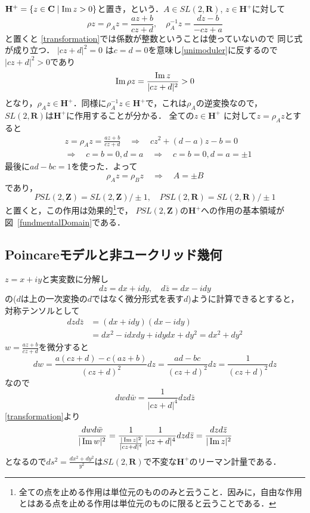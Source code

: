 $\mathbf H^{+}=\{z \in \mathbf C\mid \operatorname{Im} z  >0\}$と置き，という．$A\in SL(2,\mathbf R)$, $z\in \mathbf H^{+}$に対して
\begin{equation}\label{transformation1}
	\rho z  =\rho_{A}z = \frac{a z +b}{c z +d}, \quad
	\rho^{-1}_{A} z  = \frac{d z -b}{-c z +a}
\end{equation}
と置くと
\eqref{transformation}では係数が整数ということは使っていないので
同じ式が成り立つ．
$|c z +d|^2=0$ は$c=d=0$を意味し\eqref{unimoduler}に反するので$|c z +d|^2>0$であり
\[
	\operatorname{Im} \rho z  =\frac{ \operatorname{Im} z }{|c z +d|^2}>0
\]
となり，$\rho_{A} z \in \mathbf H^{+}$．同様に$\rho_{A}^{-1} z \in \mathbf H^{+}$で，これは$\rho_{A}$の逆変換なので，
$SL(2,\mathbf R)$は$\mathbf H^{+}$に作用することが分かる．
全ての$z\in \mathbf H^{+}$ に対して$z= \rho_{A} z$とすると
\[
\begin{split}
	&z= \rho_{A} z =\frac{a z +b}{c z +d} \quad\Rightarrow\quad
	cz^2 + (d-a)z  - b =0\\
	&\Rightarrow\quad
	c=b=0 , d=a
	\quad\Rightarrow\quad
	c=b=0 , d=a=\pm 1
\end{split}
\]
最後に$ad-bc=1$を使った．よって
\[
	\rho_{A} z=\rho_{B} z\quad\Rightarrow\quad
	A =\pm B
\]
であり，
\[
	PSL(2,\mathbf Z)
	=
	SL(2,\mathbf Z)/\pm 1,\quad
	PSL(2,\mathbf R)
	=
	SL(2,\mathbf R)/\pm 1
\]
と置くと，この作用は効果的\footnote{全ての点を止める作用は単位元のもののみと云うこと．因みに，自由な作用とはある点を止める作用は単位元のものに限ると云うことである．}で，
$PSL(2,\mathbf Z)$の$\mathbf H^{+}$への作用の基本領域が図~\ref{fundmentalDomain}である．



\subsection{Poincareモデルと非ユークリッド幾何}
$z = x + i y$と実変数に分解し
\[
	dz = dx + idy,\quad d\bar z = dx - idy
\]
の($d$は上の一次変換の$d$ではなく微分形式を表す$d$)ように計算できるとすると，対称テンソルとして
\[
\begin{split}
	dz d\bar z&=(dx + idy)( dx - idy)\\
	&=dx^2 -idxdy + idydx + dy^2
	=dx^2+dy^2
\end{split}
\]
$w= \frac{az+b}{cz+d}$を微分すると
\[
	dw = \frac{a(cz+d)-c(az+b)}{(cz+d)^2}dz
	=\frac{ad-bc}{(cz+d)^2}dz=\frac{1}{(cz+d)^2}dz
\]
なので
\[
	dw d\bar w
	=\frac{1}{|cz+d|^4}dz d\bar z
\]
\eqref{transformation}より
\[
	\frac{dw d\bar w}{|\operatorname{Im} w|^2}
	=\frac{1}{\frac{ |\operatorname{Im} z|^2}{|cz+d|^4}}
	\frac{1}{|cz+d|^4} dz d\bar z
	=\frac{dz d\bar z}{ |\operatorname{Im} z|^2}
\]
となるので$ds^2=\frac{dx^2+dy^2}{y^2}$は$SL(2,\mathbf R)$で不変な$\mathbf H^{+}$のリーマン計量である．
\emptyline


